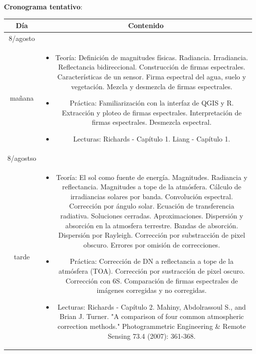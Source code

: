 \documentclass[11pt]{article}
\begin{document}
\newpage
\textbf {\large Cronograma tentativo}:

\begin{longtable}[h!]{ c  c  }
\toprule
\textbf{Día} & \textbf{Contenido} \\

\midrule
8/agosto \\ ma\~nana & \begin{minipage}{.65\textwidth}
\begin{itemize}
    \vspace{1mm}
  \item Teoría: Definición de magnitudes físicas. Radiancia. Irradiancia. Reflectancia bidireccional. Construcción de firmas espectrales. Características de un sensor. Firma espectral del agua, suelo y vegetación. Mezcla y desmezcla de firmas espectrales.
  \item Práctica: Familiarización con la interfaz de QGIS y R\@. Extracción y ploteo de firmas espectrales. Interpretación de firmas espectrales. Desmezcla espectral.
	\item Lecturas: Richards - Capítulo 1. Liang - Capítulo 1.
    \vspace{1mm}
\end{itemize}
\end{minipage} \\
\midrule
8/agostso \\ tarde & \begin{minipage}{.65\textwidth}
\begin{itemize}
    \vspace{1mm}
	\item Teoría: El sol como fuente de energía. Magnitudes. Radiancia y reflectancia. Magnitudes a tope de la atmósfera. Cálculo de irradiancias solares por banda. Convolución espectral. Corrección por ángulo solar. Ecuación de transferencia radiativa. Soluciones cerradas. Aproximaciones. Dispersión y absorción en la atmosfera terrestre. Bandas de absorción. Dispersión por Rayleigh. Corrección por substracción de pixel obscuro. Errores por omisión de correcciones.
  \item Práctica: Corrección de DN a reflectancia a tope de la atmósfera (TOA). Corrección por sustracción de pixel oscuro. Corrección con 6S. Comparación de firmas espectrales de imágenes corregidas y no corregidas.
	\item Lecturas: Richards - Capítulo 2. Mahiny, Abdolrassoul S., and Brian J.
        Turner. "A comparison of four common atmospheric correction methods."
        Photogrammetric Engineering \& Remote Sensing 73.4 (2007): 361-368.
    \vspace{1mm}
\end{itemize}
\end{minipage} \\


\end{longtable}
\end{document}
